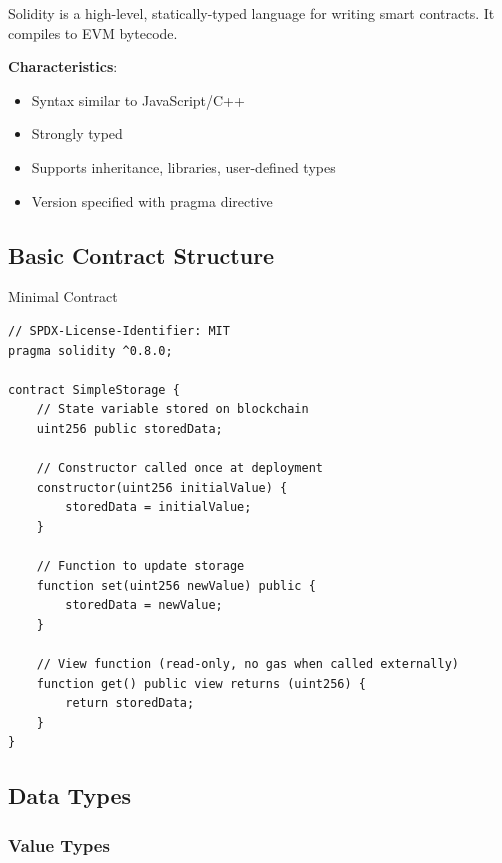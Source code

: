 \documentclass[11pt,a4paper]{article}
\begin{document}
Solidity is a high-level, statically-typed language for writing smart contracts. It compiles to EVM bytecode.

\textbf{Characteristics}:
\begin{itemize}
  \item Syntax similar to JavaScript/C++
  \item Strongly typed
  \item Supports inheritance, libraries, user-defined types
  \item Version specified with pragma directive
\end{itemize}

\subsection{Basic Contract Structure}

\begin{examplebox}{Minimal Contract}
\begin{lstlisting}[language=Solidity]
// SPDX-License-Identifier: MIT
pragma solidity ^0.8.0;

contract SimpleStorage {
    // State variable stored on blockchain
    uint256 public storedData;

    // Constructor called once at deployment
    constructor(uint256 initialValue) {
        storedData = initialValue;
    }

    // Function to update storage
    function set(uint256 newValue) public {
        storedData = newValue;
    }

    // View function (read-only, no gas when called externally)
    function get() public view returns (uint256) {
        return storedData;
    }
}
\end{lstlisting}
\end{examplebox}

\subsection{Data Types}

\subsubsection{Value Types}
\end{document}
